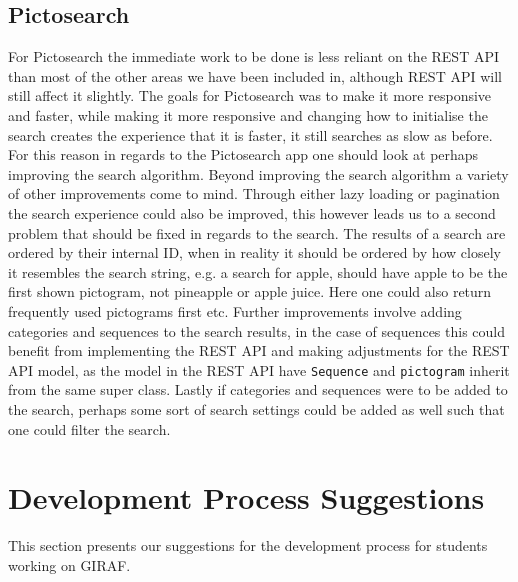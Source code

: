 \subsection*{Pictosearch}
For Pictosearch the immediate work to be done is less reliant on the REST API than most of the other areas we have been included in, although REST API will still affect it slightly.
The goals for Pictosearch was to make it more responsive and faster, while making it more responsive and changing how to initialise the search creates the experience that it is faster, it still searches as slow as before.
For this reason in regards to the Pictosearch app one should look at perhaps improving the search algorithm.
Beyond improving the search algorithm a variety of other improvements come to mind. 
Through either lazy loading or pagination the search experience could also be improved, this however leads us to a second problem that should be fixed in regards to the search.
The results of a search are ordered by their internal ID, when in reality it should be ordered by how closely it resembles the search string, e.g. a search for apple, should have apple to be the first shown pictogram, not pineapple or apple juice.
Here one could also return frequently used pictograms first etc.
Further improvements involve adding categories and sequences to the search results, in the case of sequences this could benefit from implementing the REST API and making adjustments for the REST API model, as the model in the REST API have \texttt{Sequence} and \texttt{pictogram} inherit from the same super class.
Lastly if categories and sequences were to be added to the search, perhaps some sort of search settings could be added as well such that one could filter the search.

\section{Development Process Suggestions}
This section presents our suggestions for the development process for students working on GIRAF.

